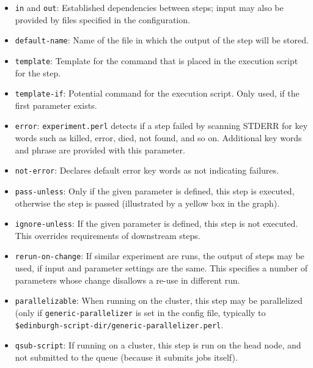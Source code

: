 \begin{itemize}
\item {\tt in} and {\tt out}: Established dependencies between steps; input may also be provided by files specified in the configuration.

\item {\tt default-name}: Name of the file in which the output of the step will be stored.

\item {\tt template}: Template for the command that is placed in the execution script for the step.

\item {\tt template-if}: Potential command for the execution script. Only used, if the first parameter exists.

\item {\tt error}: {\tt experiment.perl} detects if a step failed by scanning STDERR for key words such as killed, error, died, not found, and so on. Additional key words and phrase are provided with this parameter.

\item {\tt not-error}: Declares default error key words as not indicating failures.

\item {\tt pass-unless}: Only if the given parameter is defined, this step is executed, otherwise the step is passed (illustrated by a yellow box in the graph).

\item {\tt ignore-unless}: If the given parameter is defined, this step is not executed. This overrides requirements of downstream steps.

\item {\tt rerun-on-change}: If similar experiment are runs, the output of steps may be used, if input and parameter settings are the same. This specifies a number of parameters whose change disallows a re-use in different run.

\item {\tt parallelizable}: When running on the cluster, this step may be parallelized (only if {\tt generic-parallelizer} is set in the config file, typically to {\tt \$edinburgh-script-dir/generic-parallelizer.perl}.

\item {\tt qsub-script}: If running on a cluster, this step is run on the head node, and not submitted to the queue (because it submits jobs itself).

\end{itemize}

